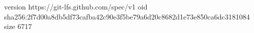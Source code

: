 version https://git-lfs.github.com/spec/v1
oid sha256:2f7d00a8db5df73cafba42c90e3f5be79a6d20c8682d1e73e850ca6dc3181084
size 6717
